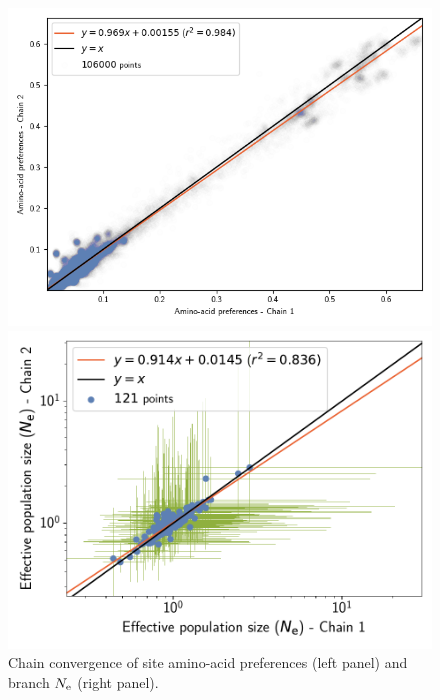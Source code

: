 \documentclass{article}
\begin{document}
	\begin{figure}[H]
		\centering
		\begin{minipage}{0.49\linewidth}
			\includegraphics[width=\linewidth, page=1]{primates/SiteMutSelBranchNe_ProfileCorrelation.png}
		\end{minipage} \hfill
		\begin{minipage}{0.49\linewidth}
			\includegraphics[width=\linewidth, page=1]{primates/SiteMutSelBranchNe_LogPopulationSizeCorrelation}
		\end{minipage}
		\caption[Chain convergence of site profiles and branche $\Ne$]{
		Chain convergence of site amino-acid preferences (left panel) and branch $\Ne$ (right panel).}
	\end{figure}
\end{document}

